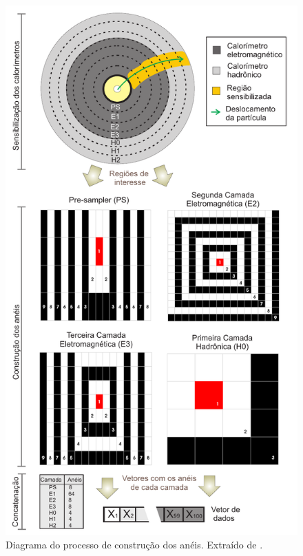\begin{figure}[hp!]
\label{fig:cons_aneis}
\centering
\includegraphics[height=0.9\textheight]{imagens/cons_aneis.pdf}
\caption[Diagrama do processo de construção dos anéis.]
{Diagrama do processo de construção dos anéis. Extraído de \cite{tese_eduardo}.}
\end{figure}

